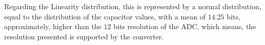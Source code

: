 Regarding the Linearity distribution, this is represented by a normal distribution, equal to the distribution of the capacitor values, with a mean of $14.25$ bits, approximately, higher than the $12$ bits resolution of the ADC, which means, the resolution presented is supported by the converter.

